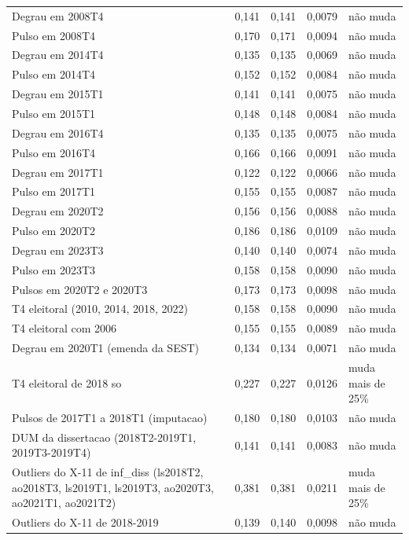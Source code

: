\begin{table}[htbp]
\begin{tabular}{lcccl}
Degrau em 2008T4 & 0{,}141 & 0{,}141 & 0{,}0079 & n\~ao muda \\
Pulso em 2008T4 & 0{,}170 & 0{,}171 & 0{,}0094 & n\~ao muda \\
Degrau em 2014T4 & 0{,}135 & 0{,}135 & 0{,}0069 & n\~ao muda \\
Pulso em 2014T4 & 0{,}152 & 0{,}152 & 0{,}0084 & n\~ao muda \\
Degrau em 2015T1 & 0{,}141 & 0{,}141 & 0{,}0075 & n\~ao muda \\
Pulso em 2015T1 & 0{,}148 & 0{,}148 & 0{,}0084 & n\~ao muda \\
Degrau em 2016T4 & 0{,}135 & 0{,}135 & 0{,}0075 & n\~ao muda \\
Pulso em 2016T4 & 0{,}166 & 0{,}166 & 0{,}0091 & n\~ao muda \\
Degrau em 2017T1 & 0{,}122 & 0{,}122 & 0{,}0066 & n\~ao muda \\
Pulso em 2017T1 & 0{,}155 & 0{,}155 & 0{,}0087 & n\~ao muda \\
Degrau em 2020T2 & 0{,}156 & 0{,}156 & 0{,}0088 & n\~ao muda \\
Pulso em 2020T2 & 0{,}186 & 0{,}186 & 0{,}0109 & n\~ao muda \\
Degrau em 2023T3 & 0{,}140 & 0{,}140 & 0{,}0074 & n\~ao muda \\
Pulso em 2023T3 & 0{,}158 & 0{,}158 & 0{,}0090 & n\~ao muda \\
Pulsos em 2020T2 e 2020T3 & 0{,}173 & 0{,}173 & 0{,}0098 & n\~ao muda \\
T4 eleitoral (2010, 2014, 2018, 2022) & 0{,}158 & 0{,}158 & 0{,}0090 & n\~ao muda \\
T4 eleitoral com 2006 & 0{,}155 & 0{,}155 & 0{,}0089 & n\~ao muda \\
Degrau em 2020T1 (emenda da SEST) & 0{,}134 & 0{,}134 & 0{,}0071 & n\~ao muda \\
T4 eleitoral de 2018 so & 0{,}227 & 0{,}227 & 0{,}0126 & muda mais de 25\% \\
Pulsos de 2017T1 a 2018T1 (imputacao) & 0{,}180 & 0{,}180 & 0{,}0103 & n\~ao muda \\
DUM da dissertacao (2018T2-2019T1, 2019T3-2019T4) & 0{,}141 & 0{,}141 & 0{,}0083 & n\~ao muda \\
Outliers do X-11 de inf\_diss (ls2018T2, ao2018T3, ls2019T1, ls2019T3, ao2020T3, ao2021T1, ao2021T2) & 0{,}381 & 0{,}381 & 0{,}0211 & muda mais de 25\% \\
Outliers do X-11 de 2018-2019 & 0{,}139 & 0{,}140 & 0{,}0098 & n\~ao muda \\

\end{tabular}
\end{table}
